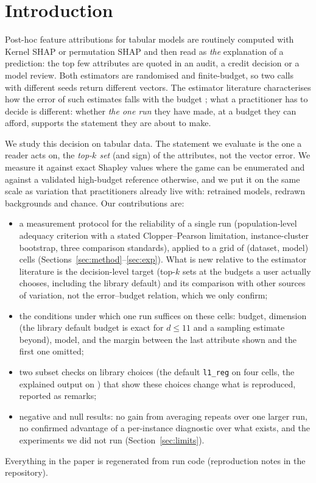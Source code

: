 \section{Introduction}
Post-hoc feature attributions for tabular models are routinely computed with Kernel SHAP or permutation SHAP \citep{lundberg2017unified} and then read as \emph{the} explanation of a prediction: the top few attributes are quoted in an audit, a credit decision or a model review. Both estimators are randomised and finite-budget, so two calls with different seeds return different vectors. The estimator literature characterises how the error of such estimates falls with the budget \citep{covert2020improving,mitchell2021sampling,musco2024leverage}; what a practitioner has to decide is different: whether \emph{the one run} they have made, at a budget they can afford, supports the statement they are about to make.

We study this decision on tabular data. The statement we evaluate is the one a reader acts on, the \emph{top-$k$ set} (and sign) of the attributes, not the vector error. We measure it against exact Shapley values where the game can be enumerated and against a validated high-budget reference otherwise, and we put it on the same scale as variation that practitioners already live with: retrained models, redrawn backgrounds and chance. Our contributions are:
\begin{itemize}
\item a measurement protocol for the reliability of a single run (population-level adequacy criterion with a stated Clopper--Pearson limitation, instance-cluster bootstrap, three comparison standards), applied to a grid of \numnCells{} (dataset, model) cells (Sections~\ref{sec:method}--\ref{sec:exp}). What is new relative to the estimator literature is the decision-level target (top-$k$ sets at the budgets a user actually chooses, including the library default) and its comparison with other sources of variation, not the error--budget relation, which we only confirm;
\item the conditions under which one run suffices on these cells: budget, dimension (the library default budget is exact for $d\le11$ and a sampling estimate beyond), model, and the margin between the last attribute shown and the first one omitted;
\item two subset checks on library choices (the default \texttt{l1\_reg} on four cells, the explained output on \numnLogitCells{}) that show these choices change what is reproduced, reported as remarks;
\item negative and null results: no gain from averaging repeats over one larger run, no confirmed advantage of a per-instance diagnostic over what exists, and the experiments we did not run (Section~\ref{sec:limits}).
\end{itemize}
Everything in the paper is regenerated from run code (reproduction notes in the repository).
